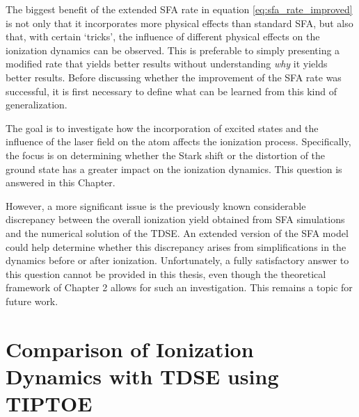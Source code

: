 The biggest benefit of the extended SFA rate in equation \eqref{eq:sfa_rate_improved} is not only that it incorporates more physical effects than standard SFA, but also that, with certain `tricks’, the influence of different physical effects on the ionization dynamics can be observed. This is preferable to simply presenting a modified rate that yields better results without understanding \emph{why} it yields better results. Before discussing whether the improvement of the SFA rate was successful, it is first necessary to define what can be learned from this kind of generalization.

The goal is to investigate how the incorporation of excited states and the influence of the laser field on the atom affects the ionization process. Specifically, the focus is on determining whether the Stark shift or the distortion of the ground state has a greater impact on the ionization dynamics. This question is answered in this Chapter.

However, a more significant issue is the previously known considerable discrepancy between the overall ionization yield obtained from SFA simulations and the numerical solution of the TDSE. An extended version of the SFA model could help determine whether this discrepancy arises from simplifications in the dynamics before or after ionization. Unfortunately, a fully satisfactory answer to this question cannot be provided in this thesis, even though the theoretical framework of Chapter 2 allows for such an investigation. This remains a topic for future work.








\section{Comparison of Ionization Dynamics with TDSE using TIPTOE}
